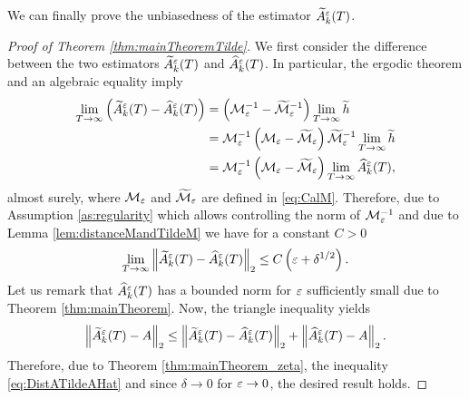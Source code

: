 \documentclass[10pt]{article}
\begin{document}
\begin{appendices}
We can finally prove the unbiasedness of the estimator $\widetilde A^\varepsilon_k(T)$.

\begin{proof}[Proof of Theorem \ref{thm:mainTheoremTilde}] We first consider the difference between the two estimators $\widetilde A^\varepsilon_k(T)$ and $\widehat A^\varepsilon_k(T)$. In particular, the ergodic theorem and an algebraic equality imply
	\begin{equation}
	\begin{aligned}
	\lim_{T \to \infty} \left(\widetilde A^\varepsilon_k(T) - \widehat A^\varepsilon_k(T)\right) &= \left(\mathcal M_\varepsilon^{-1} - \widetilde{\mathcal M}_\varepsilon^{-1}\right) \lim_{T \to \infty}\widetilde h \\
	&= \mathcal M_\varepsilon^{-1}\left(\mathcal M_\varepsilon - \widetilde{\mathcal M}_\varepsilon\right)  \widetilde{\mathcal M}_\varepsilon^{-1} \lim_{T \to \infty} \widetilde h\\
	&= \mathcal M_\varepsilon^{-1}\left(\mathcal M_\varepsilon - \widetilde{\mathcal M}_\varepsilon\right)\lim_{T \to \infty} \widehat A^\varepsilon_k(T),
	\end{aligned}
	\end{equation}
	almost surely, where $\mathcal M_\varepsilon$ and $\widetilde{\mathcal M}_\varepsilon$ are defined in \eqref{eq:CalM}. Therefore, due to Assumption \ref{as:regularity} which allows controlling the norm of $\mathcal M_\varepsilon^{-1}$ and due to Lemma \ref{lem:distanceMandTildeM} we have for a constant $C > 0$
	\begin{equation}\label{eq:DistATildeAHat}
	\lim_{T \to \infty} \left\|\widetilde A^\varepsilon_k(T) - \widehat A^\varepsilon_k(T)\right\|_2 \leq C \left(\varepsilon + \delta^{1/2} \right).
	\end{equation}
	Let us remark that $\widehat A^\varepsilon_k(T)$ has a bounded norm for $\varepsilon$ sufficiently small due to Theorem \ref{thm:mainTheorem}. Now, the triangle inequality yields
	\begin{equation}
	\left\|\widetilde A^\varepsilon_k(T) - A\right\|_2 \leq \left\|\widetilde A^\varepsilon_k(T) - \widehat A^\varepsilon_k(T)\right\|_2 + \left\|\widehat A^\varepsilon_k(T) - A\right\|_2.
	\end{equation}
	Therefore, due to Theorem \ref{thm:mainTheorem_zeta}, the inequality \eqref{eq:DistATildeAHat} and since $\delta \to 0$ for $\varepsilon \to 0$, the desired result holds.
\end{proof}

\end{appendices}




\end{document}
